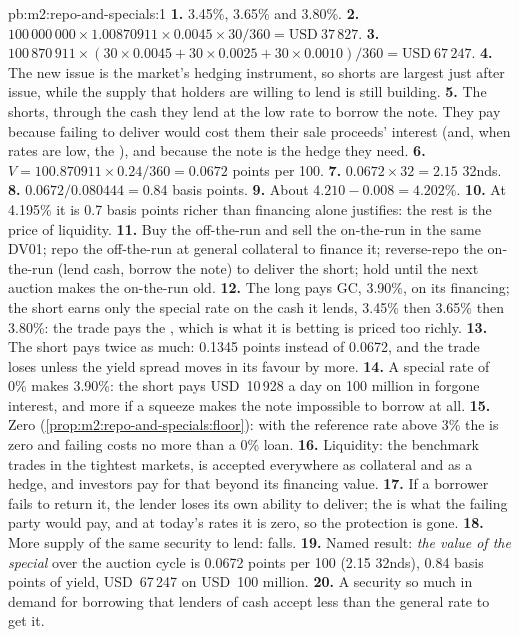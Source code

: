 \begin{solution}{pb:m2:repo-and-specials:1}
\textbf{1.} 3.45\%, 3.65\% and 3.80\%.
\textbf{2.} $100\,000\,000 \times 1.00870911 \times 0.0045 \times 30/360 =
\text{USD}~37\,827$.
\textbf{3.} $100\,870\,911 \times (30 \times 0.0045 + 30 \times 0.0025 + 30 \times
0.0010)/360 = \text{USD}~67\,247$.
\textbf{4.} The new issue is the market's hedging instrument, so shorts are
largest just after issue, while the supply that holders are willing to lend
is still building.
\textbf{5.} The shorts, through the cash they lend at the low rate to borrow the
note. They pay because failing to deliver would cost them their sale proceeds'
interest (and, when rates are low, the ), and because the note is
the hedge they need.
\textbf{6.} $V = 100.870911 \times 0.24/360 = 0.0672$ points per 100.
\textbf{7.} $0.0672 \times 32 = 2.15$ 32nds.
\textbf{8.} $0.0672/0.080444 = 0.84$ basis points.
\textbf{9.} About $4.210 - 0.008 = 4.202\%$.
\textbf{10.} At 4.195\% it is 0.7 basis points richer than financing alone
justifies: the rest is the price of liquidity.
\textbf{11.} Buy the off-the-run and sell the on-the-run in the same DV01; repo
the off-the-run at general collateral to finance it; reverse-repo the
on-the-run (lend cash, borrow the note) to deliver the short; hold until the
next auction makes the on-the-run old.
\textbf{12.} The long pays GC, 3.90\%, on its financing; the short earns only
the special rate on the cash it lends, 3.45\% then 3.65\% then 3.80\%: the
trade pays the , which is what it is betting is priced too richly.
\textbf{13.} The short pays twice as much: 0.1345 points instead of 0.0672, and
the trade loses unless the yield spread moves in its favour by more.
\textbf{14.} A special rate of 0\% makes  3.90\%: the short pays
USD~10\,928 a day on 100 million in forgone interest, and more if a squeeze
makes the note impossible to borrow at all.
\textbf{15.} Zero (\cref{prop:m2:repo-and-specials:floor}): with the reference
rate above 3\% the  is zero and failing costs no more than a
0\% loan.
\textbf{16.} Liquidity: the benchmark trades in the tightest markets, is
accepted everywhere as collateral and as a hedge, and investors pay for that
beyond its financing value.
\textbf{17.} If a borrower fails to return it, the lender loses its own ability
to deliver; the  is what the failing party would pay, and at
today's rates it is zero, so the protection is gone.
\textbf{18.} More supply of the same security to lend:  falls.
\textbf{19.} Named result: \emph{the value of the special} over the auction
cycle is 0.0672 points per 100 (2.15 32nds), 0.84 basis points of yield, USD~67\,247
on USD~100 million.
\textbf{20.} A security so much in demand for borrowing that lenders of cash
accept less than the general rate to get it.
\end{solution}

